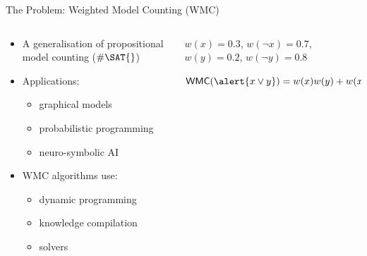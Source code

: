 \documentclass{beamer}
\begin{document}
\begin{frame}{The Problem: Weighted Model Counting (WMC)}
  \begin{columns}
    \begin{column}{0.5\textwidth}
      \begin{itemize}
        \item A generalisation of propositional model counting ($\#\SAT{}$)
        \item Applications:
        \begin{itemize}
          \item graphical models
          \item probabilistic programming
          \item neuro-symbolic AI
        \end{itemize}
        \item WMC algorithms use:
        \begin{itemize}
          \item dynamic programming
          \item knowledge compilation
          \item \SAT{} solvers
        \end{itemize}
      \end{itemize}
    \end{column}
    \begin{column}{0.5\textwidth}
      \begin{example}
        $w(x) = 0.3$, $w(\neg x) = 0.7$, $w(y) = 0.2$, $w(\neg y) = 0.8$
        \vspace{1cm}

        $\mathsf{WMC}(\alert{x \lor y}) = w(x)w(y) + w(x)w(\neg y) + w(\neg x)w(y) = 0.44$
      \end{example}
    \end{column}
  \end{columns}
\end{frame}
\end{document}
